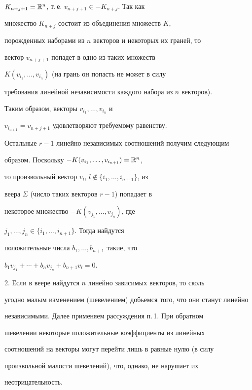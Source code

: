 \begin{pf}
$K_{n+j+1}=\Bbb{R}^n$, т.\,е. $v_{n+j+1}\in -K_{n+j}$. Так как


множество $K_{n+j}$ состоит из объединения множеств $K$,


порожденных наборами из $n$ векторов и некоторых их граней, то


вектор $v_{n+j+1}$ попадет в одно из таких множеств


$K(v_{i_1},\dotsc,v_{i_n})$ (на грань он попасть не может в силу


требования линейной независимости каждого набора из $n$ векторов).


Таким образом, векторы $v_{i_1},\dotsc,v_{i_n}$ и


$v_{i_{n+1}}=v_{n+j+1}$ удовлетворяют требуемому равенству.





Остальные $r-1$ линейно независимых соотношений получим следующим


образом. Поскольку $-K(v_{i_1},\dotsc,v_{i_{n+1}})=\Bbb{R}^n$,


то произвольный вектор $v_l$, $l\notin \{i_1,\dotsc,i_{n+1}\}$, из


веера $\Sigma$ (число таких векторов $r-1$) попадает в


некоторое множество $-K(v_{j_1},\dotsc,v_{j_n})$, где


$j_1,\dotsc,j_n\in \{i_1,\dotsc,i_{n+1}\}$. Тогда найдутся


положительные числа $b_1,\dotsc,b_{n+1}$ такие, что


$b_1v_{j_1}+\dotsb+b_nv_{j_n}+ b_{n+1}v_l=0$.





2. Если в веере найдутся $n$ линейно зависимых векторов, то сколь


угодно малым изменением (шевелением) добьемся того, что они станут линейно


независимыми. Далее применяем рассуждения п.\,1. При обратном


шевелении некоторые положительные коэффициенты из линейных


соотношений на  векторы могут перейти лишь в равные нулю (в силу


произвольной малости шевелений), что, однако, не нарушает их


неотрицательность.


\end{pf}





